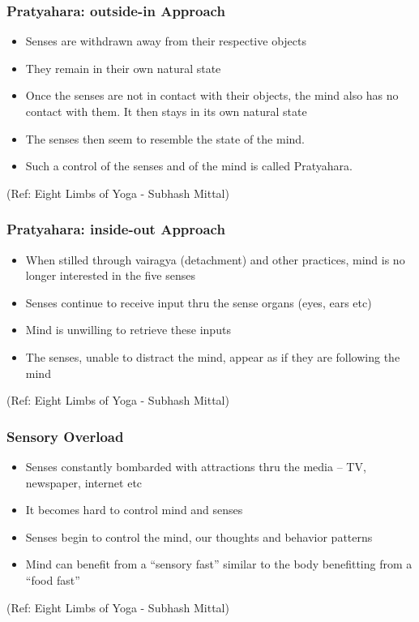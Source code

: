 \begin{frame}[fragile]\frametitle{Pratyahara: outside-in Approach}


	\begin{itemize}
	\item  Senses are withdrawn away from their respective 
objects
	\item   They remain in their own natural state
	\item   Once the senses are not in contact with their 
objects, the mind also has no contact with them. 
It then stays in its own natural state
	\item   The senses then seem to resemble the state of 
the mind. 
	\item   Such a control of the senses and of the mind is 
called Pratyahara.
	\end{itemize}

\tiny{(Ref: Eight Limbs of Yoga - Subhash Mittal)}

\end{frame}

\begin{frame}[fragile]\frametitle{Pratyahara: inside-out Approach}


	\begin{itemize}
	\item When stilled through vairagya (detachment) 
and other practices, mind is no longer 
interested in the five senses
	\item  Senses continue to receive input thru the 
sense organs (eyes, ears etc)
	\item Mind is unwilling to retrieve these inputs
	\item  The senses, unable to distract the mind, 
appear as if they are following the mind
	\end{itemize}

\tiny{(Ref: Eight Limbs of Yoga - Subhash Mittal)}

\end{frame}


\begin{frame}[fragile]\frametitle{Sensory Overload}


	\begin{itemize}
	\item  Senses constantly bombarded with attractions 
thru the media – TV, newspaper, internet etc
	\item  It becomes hard to control mind and senses
	\item  Senses begin to control the mind, our 
thoughts and behavior patterns
	\item  Mind can benefit from a ``sensory fast'' similar 
to the body benefitting from a ``food fast''
	\end{itemize}

\tiny{(Ref: Eight Limbs of Yoga - Subhash Mittal)}

\end{frame}

